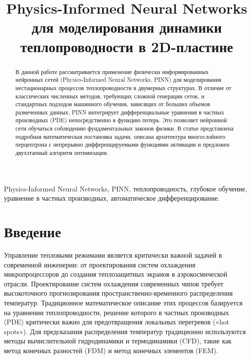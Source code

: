\documentclass[conference]{IEEEtran}
\begin{document}
\title{Physics-Informed Neural Networks для моделирования динамики теплопроводности в 2D-пластине}

\author{
\and
{}
}

\maketitle

\begin{abstract}
    В данной работе рассматривается применение физически информированных нейронных сетей (Physics-Informed Neural Networks, PINN) для моделирования нестационарных процессов теплопроводности в двумерных структурах. В отличие от классических численных методов, требующих сложной генерации сеток, и стандартных подходов машинного обучения, зависящих от больших объемов размеченных данных, PINN интегрирует дифференциальные уравнения в частных производных (PDE) непосредственно в функцию потерь. Это позволяет нейронной сети обучаться соблюдению фундаментальных законов физики. В статье представлена подробная математическая постановка задачи, описана архитектура многослойного перцептрона с непрерывно дифференцируемыми функциями активации и предложен двухэтапный алгоритм оптимизации.
    \end{abstract}
    
    \begin{IEEEkeywords}
    Physics-Informed Neural Networks, PINN, теплопроводность, глубокое обучение, уравнение в частных производных, автоматическое дифференцирование.
    \end{IEEEkeywords}
    
    \section{Введение}
    
    Управление тепловыми режимами является критически важной задачей в современной инженерии: от проектирования систем охлаждения микропроцессоров до создания теплозащитных экранов в аэрокосмической отрасли. Проектирование систем охлаждения современных чипов требует высокоточного прогнозирования пространственно-временного распределения температур. Традиционное математическое описание этих процессов базируется на уравнении теплопроводности, решение которого в частных производных (PDE) критически важно для предотвращения локальных перегревов («hot spots»). Для предсказания распределения температур традиционно используются методы вычислительной гидродинамики и термодинамики (CFD), такие как метод конечных разностей (FDM) и метод конечных элементов (FEM). 
    
\end{document}
